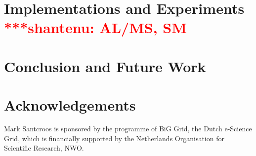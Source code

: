 \documentclass[conference,final]{IEEEtran}
\newcommand{\jhanote}[1]{ {\textcolor{red} { ***shantenu: #1 }}}
\newcommand{\jhanote}[1]{}
\begin{document}
\section{Implementations and Experiments \jhanote{AL/MS, SM}}


\section{Conclusion and Future Work}

\section*{Acknowledgements}
Mark Santcroos is sponsored by the programme of BiG Grid, the Dutch e-Science Grid, which is financially supported by the Netherlands Organisation for Scientific Research, NWO.




\end{document}
